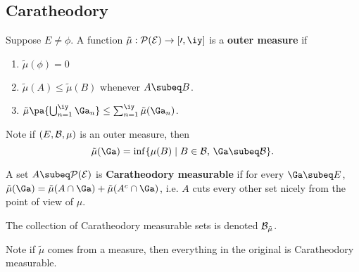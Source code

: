 
\subsection{Caratheodory}
\begin{df}
Suppose $E\ne \phi$. A function $\tilde{\mu}:\cal P(E)\to [0,\iy]$ is a \textbf{outer measure} if 
\begin{enumerate}
\item $\tilde{\mu}(\phi)=0$
\item $\tilde{\mu}(A)\le \tilde{\mu}(B)$ whenever $A\subeq B$.
\item $\tilde{\mu}\pa{\bigcup_{n=1}^{\iy} \Ga_n} \le \sum_{n=1}^{\iy} \tilde{\mu}(\Ga_n)$.
\end{enumerate}
\end{df}
Note if $(E,\cal B, \mu)$ is an outer measure, then
\[
\tilde{\mu}(\Ga)=\inf\{ \mu(B)\mid B\in \cal B,\, \Ga\subeq B\}.
\]
\begin{df}
A set $A\subeq \cal P(E)$ is \textbf{Caratheodory measurable} if for every $\Ga\subeq E$, $\tilde{\mu}(\Ga)=\tilde{\mu} (A\cap \Ga)+\tilde{\mu}(A^c\cap \Ga)$, i.e. $A$ cuts every other set nicely from the point of view of $\mu$.

The collection of Caratheodory measurable sets is denoted $\cal B_{\tilde{\mu}}$.
\end{df}
Note if $\tilde{\mu}$ comes from a measure, then everything in the original \sia{} is Caratheodory measurable.


